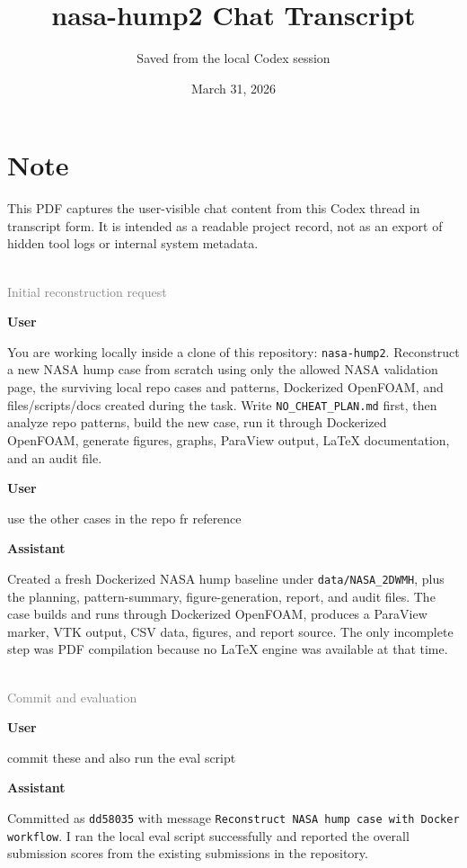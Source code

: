 \documentclass[11pt]{article}
\title{nasa-hump2 Chat Transcript}
\author{Saved from the local Codex session}
\date{March 31, 2026}
\newcommand{\turnheader}[2]{
  \vspace{0.8em}
  \noindent{\large\textbf{#1}}\\
  \noindent\textcolor{gray}{#2}
  \vspace{0.35em}
}
\newenvironment{chatuser}
  {\par\noindent\color{userblue}\textbf{User}\par\noindent\begin{minipage}{\linewidth}\raggedright}
  {\end{minipage}\par}
\newenvironment{chatassistant}
  {\par\noindent\color{assistantgreen}\textbf{Assistant}\par\noindent\begin{minipage}{\linewidth}\raggedright}
  {\end{minipage}\par}
\begin{document}
\maketitle

\section*{Note}
This PDF captures the user-visible chat content from this Codex thread in transcript form. It is intended as a readable project record, not as an export of hidden tool logs or internal system metadata.

\turnheader{Turn 1}{Initial reconstruction request}
\begin{chatuser}
You are working locally inside a clone of this repository: \texttt{nasa-hump2}. Reconstruct a new NASA hump case from scratch using only the allowed NASA validation page, the surviving local repo cases and patterns, Dockerized OpenFOAM, and files/scripts/docs created during the task. Write \texttt{NO\_CHEAT\_PLAN.md} first, then analyze repo patterns, build the new case, run it through Dockerized OpenFOAM, generate figures, graphs, ParaView output, LaTeX documentation, and an audit file.
\end{chatuser}

\begin{chatuser}
use the other cases in the repo fr reference
\end{chatuser}

\begin{chatassistant}
Created a fresh Dockerized NASA hump baseline under \texttt{data/NASA\_2DWMH}, plus the planning, pattern-summary, figure-generation, report, and audit files. The case builds and runs through Dockerized OpenFOAM, produces a ParaView marker, VTK output, CSV data, figures, and report source. The only incomplete step was PDF compilation because no LaTeX engine was available at that time.
\end{chatassistant}

\turnheader{Turn 2}{Commit and evaluation}
\begin{chatuser}
commit these and also run the eval script
\end{chatuser}

\begin{chatassistant}
Committed as \texttt{dd58035} with message \texttt{Reconstruct NASA hump case with Docker workflow}. I ran the local eval script successfully and reported the overall submission scores from the existing submissions in the repository.
\end{chatassistant}
\end{document}
